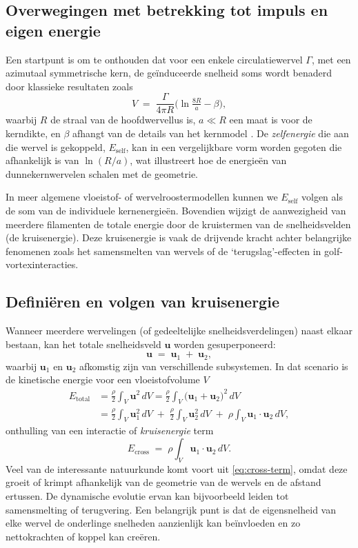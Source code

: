 \subsection{Overwegingen met betrekking tot impuls en eigen energie}
\label{sec:impuls}
Een startpunt is om te onthouden dat voor een enkele circulatiewervel $\Gamma$, met een
azimutaal symmetrische kern, de geïnduceerde snelheid soms wordt benaderd door
klassieke resultaten zoals
\begin{equation}
V \;=\; \frac{\Gamma}{4 \pi R}
\bigl(\ln \tfrac{8 R}{a} - \beta \bigr),\label{eq:appendix:velocity}
\end{equation}
waarbij $R$ de straal van de hoofdwervellus is, $a \ll R$ een maat is voor de kerndikte,
en $\beta$ afhangt van de details van het kernmodel \cite{Saffman1992}. De
\emph{zelfenergie} die aan die wervel is gekoppeld, $E_\text{self}$, kan in een
vergelijkbare vorm worden gegoten die afhankelijk is van $\ln(R/a)$, wat illustreert hoe de energieën van dunnekernwervelen
schalen met de geometrie.

In meer algemene vloeistof- of wervelroostermodellen kunnen we $E_\text{self}$ volgen als de
som van de individuele kernenergieën. Bovendien wijzigt de aanwezigheid van meerdere filamenten
de totale energie door de kruistermen van de snelheidsvelden (de kruisenergie). Deze
kruisenergie is vaak de drijvende kracht achter belangrijke fenomenen zoals het samensmelten van wervels of de `terugslag'-effecten
in golf-vortexinteracties.

\subsection{Definiëren en volgen van kruisenergie}
\label{sec:cross}
Wanneer meerdere wervelingen (of gedeeltelijke snelheidsverdelingen) naast elkaar bestaan, kan het totale snelheidsveld $\mathbf{u}$ worden gesuperponeerd:
\begin{equation}
\mathbf{u} \;=\; \mathbf{u}_1 \;+\;\mathbf{u}_2,\label{eq:appendix:superpose}
\end{equation}
waarbij $\mathbf{u}_1$ en $\mathbf{u}_2$ afkomstig zijn van verschillende subsystemen. In dat
scenario is de kinetische energie voor een vloeistofvolume $V$
\begin{align}
E_\text{total} &= \frac{\rho}{2} \int_V \mathbf{u}^2 \,dV
= \frac{\rho}{2} \int_V \bigl(\mathbf{u}_1 + \mathbf{u}_2 \bigr)^2\, dV \\
&= \frac{\rho}{2} \int_V \mathbf{u}_1^2 \,dV \;+\;\frac{\rho}{2} \int_V \mathbf{u}_2^2 \,dV
\;+\;\rho \int_V \mathbf{u}_1 \cdot \mathbf{u}_2 \, dV,
\end{align}
onthulling van een interactie of \emph{kruisenergie} term
\begin{equation}
E_\text{cross} \;=\; \rho \int_V \mathbf{u}_1 \cdot \mathbf{u}_2 \, dV.
\label{eq:cross-term}
\end{equation}
Veel van de interessante natuurkunde komt voort uit \eqref{eq:cross-term}, omdat deze
groeit of krimpt afhankelijk van de geometrie van de wervels en de afstand ertussen.
De dynamische evolutie ervan kan bijvoorbeeld leiden tot samensmelting of terugvering. Een belangrijk punt is dat
de eigensnelheid van elke wervel de onderlinge snelheden aanzienlijk kan beïnvloeden en zo
nettokrachten of koppel kan creëren.
